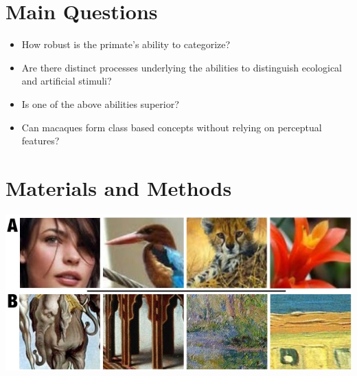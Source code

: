 \documentclass[a0,portrait]{a0poster}
\begin{document}
\begin{multicols}{2}

\color{Black}
\section*{Main Questions}

\begin{itemize}
\item How robust is the primate's ability to categorize?
\item Are there distinct processes underlying the abilities to distinguish ecological and artificial stimuli?
\item Is one of the above abilities superior?
\item Can macaques form class based concepts without relying on perceptual features?
\end{itemize}


\section*{Materials and Methods}

\begin{center}
\includegraphics[width=1\linewidth]{stim.jpg}
\end{center}\vspace{0.5cm}
%


\end{multicols}
\end{document}
